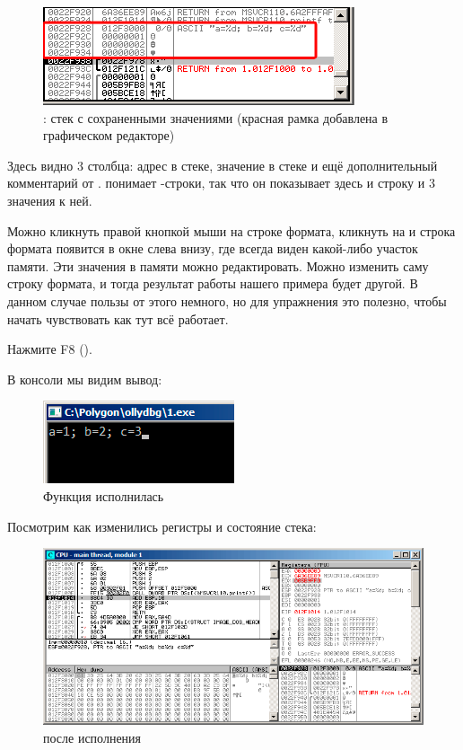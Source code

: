 \begin{figure}[H]
\centering
\includegraphics[scale=\NormalScale]{patterns/03_printf/x86/olly3_stack.png}
\caption{\olly: стек с сохраненными значениями (красная рамка добавлена в графическом редакторе)}
\end{figure}

Здесь видно 3 столбца: адрес в стеке, значение в стеке и ещё дополнительный комментарий
от \olly. 
\olly понимает \printf{}-строки, так что он показывает здесь и строку и 3 значения  к ней.

Можно кликнуть правой кнопкой мыши на строке формата, кликнуть на 
и строка формата появится в окне слева внизу, где всегда виден какой-либо участок памяти.
Эти значения в памяти можно редактировать.
Можно изменить саму строку формата, и тогда результат работы нашего примера будет другой.
В данном случае пользы от этого немного, но для упражнения это полезно,
чтобы начать чувствовать как тут всё работает.

\clearpage
Нажмите F8 (\stepover).

В консоли мы видим вывод:

\begin{figure}[H]
\centering
\includegraphics[scale=\NormalScale]{patterns/03_printf/x86/olly3_console.png}
\caption{Функция \printf исполнилась}
\end{figure}

Посмотрим как изменились регистры и состояние стека: 

\begin{figure}[H]
\centering
\includegraphics[scale=\FigScale]{patterns/03_printf/x86/olly3_3.png}
\caption{\olly после исполнения \printf}
\label{fig:printf3_olly_3}
\end{figure}

